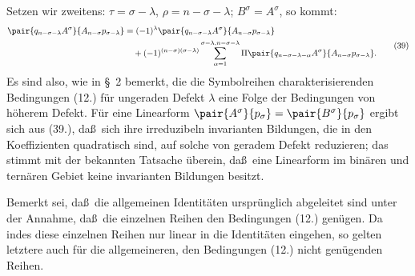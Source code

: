 Setzen wir zweitens: $\tau=\sigma-\lambda$, $\rho=n-\sigma-\lambda$; $B^\sigma=A^\sigma$, so kommt:
\begin{equation}
\begin{aligned}
\pair{q_{n-\sigma-\lambda}A^\sigma}{A_{n-\sigma}p_{\sigma-\lambda}}
&=(-1)^\lambda\pair{q_{n-\sigma-\lambda}A^\sigma}{A_{n-\sigma}p_{\sigma-\lambda}}\\
&\quad+(-1)^{(n-\sigma)(\sigma-\lambda)}
 \sum_{\alpha=1}^{\sigma-\lambda,n-\sigma-\lambda}
 \Pi\pair{q_{n-\sigma-\lambda-\alpha}A^\sigma}{A_{n-\sigma}p_{\sigma-\lambda}}.
\end{aligned}
\tag{39}
\end{equation}
Es sind also, wie in \S\ 2 bemerkt, die die Symbolreihen charakterisierenden Bedingungen (12.) f\"ur ungeraden Defekt $\lambda$ eine Folge der Bedingungen von h\"oherem Defekt. F\"ur eine Linearform $\pair{A^\sigma}{p_\sigma}=\pair{B^\sigma}{p_\sigma}$ ergibt sich aus (39.), da\ss\ sich ihre irreduzibeln invarianten Bildungen, die in den Koeffizienten quadratisch sind, auf solche von geradem Defekt reduzieren; das stimmt mit der bekannten Tatsache \"uberein, da\ss\ eine Linearform im bin\"aren und tern\"aren Gebiet keine invarianten Bildungen besitzt.

Bemerkt sei, da\ss\ die allgemeinen Identit\"aten urspr\"unglich abgeleitet sind unter der Annahme, da\ss\ die einzelnen Reihen den Bedingungen (12.) gen\"ugen. Da indes diese einzelnen Reihen nur linear in die Identit\"aten eingehen, so gelten letztere auch f\"ur die allgemeineren, den Bedingungen (12.) nicht gen\"ugenden Reihen.

